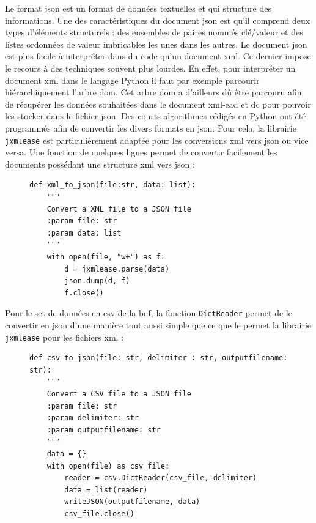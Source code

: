 \documentclass[a4paper, 12pt, twoside]{book}
\begin{document}
Le format \gls{json} est un format de données textuelles et qui structure des informations. Une des caractéristiques du document \gls{json} est qu'il comprend deux types d'éléments structurels : des ensembles de paires nommés clé/valeur et des listes ordonnées de valeur imbricables les unes dans les autres. Le document \gls{json} est plus facile à interpréter dans du code qu'un document \gls{xml}. Ce dernier impose le recours à des techniques souvent plus lourdes. En effet, pour interpréter un document \gls{xml} dans le langage Python il faut par exemple parcourir hiérarchiquement l'arbre \gls{dom}. 
Cet arbre \gls{dom} a d'ailleurs dû être parcouru afin de récupérer les données souhaitées dans le document \gls{xml}-\gls{ead} et \gls{dc} pour pouvoir les stocker dans le fichier \gls{json}. Des courts algorithmes rédigés en Python ont été programmés afin de convertir les divers formats en \gls{json}. Pour cela, la librairie \texttt{jxmlease} est particulièrement adaptée pour les conversions \gls{xml} vers \gls{json} ou vice versa. Une fonction de quelques lignes permet de convertir facilement les documents possédant une structure \gls{xml} vers \gls{json} :

\begin{figure}[h]
\begin{lstlisting}
def xml_to_json(file:str, data: list):
    """
    Convert a XML file to a JSON file 
    :param file: str
    :param data: list
    """
    with open(file, "w+") as f: 
        d = jxmlease.parse(data)
        json.dump(d, f)
        f.close()
\end{lstlisting}
\end{figure}


Pour le set de données en \gls{csv} de la \gls{bnf}, la fonction \texttt{DictReader} permet de le convertir en \gls{json} d'une manière tout aussi simple que ce que le permet la librairie \texttt{jxmlease} pour les fichiers \gls{xml} :

\begin{figure}[h]
\begin{lstlisting}
def csv_to_json(file: str, delimiter : str, outputfilename: str):
    """
    Convert a CSV file to a JSON file 
    :param file: str
    :param delimiter: str
    :param outputfilename: str
    """
    data = {}
    with open(file) as csv_file:
        reader = csv.DictReader(csv_file, delimiter)
        data = list(reader)
        writeJSON(outputfilename, data)
        csv_file.close()
\end{lstlisting}
\end{figure}
\end{document}
